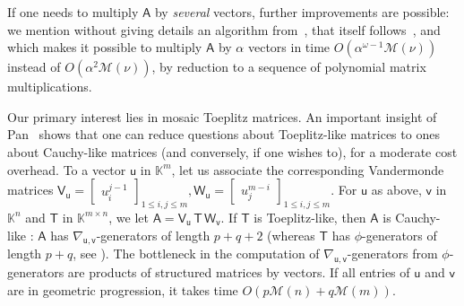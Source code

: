 \documentclass[sigconf]{acmart}
\newcommand{\ve}{\ensuremath{\mathsf{e}}}
\newcommand{\vg}{\ensuremath{\mathsf{g}}}
\newcommand{\vh}{\ensuremath{\mathsf{h}}}
\newcommand{\vu}{\ensuremath{\mathsf{u}}}
\newcommand{\vv}{\ensuremath{\mathsf{v}}}
\newcommand{\mA}{\ensuremath{\mathsf{A}}}
\newcommand{\mG}{\ensuremath{\mathsf{G}}}
\newcommand{\mH}{\ensuremath{\mathsf{H}}}
\newcommand{\mT}{\ensuremath{\mathsf{T}}}
\newcommand{\mV}{\ensuremath{\mathsf{V}}}
\newcommand{\mW}{\ensuremath{\mathsf{W}}}
\newcommand{\K}{\ensuremath{\mathbb{K}}}
\newcommand{\M}{\ensuremath{\mathscr{M}}}
\newcommand{\mx}{\ensuremath{\nu}}
\newcommand{\todo}[1]{(\textbf{todo:} #1)}
\theoremstyle{acmdefinition}
\begin{document}
If one needs to multiply $\mA$ by {\em several} vectors,
further improvements are possible: we mention without giving details
an algorithm from~\cite{BoJeMoSc16}, that itself
follows~\cite{BoJeSc08}, and which makes it possible to multiply $\mA$
by $\alpha$ vectors in time $O(\alpha^{\omega-1} \M(\mx))$ instead of
$O(\alpha^2 \M(\mx))$, by reduction to a sequence of polynomial matrix
multiplications.

{}
Our primary interest lies in mosaic
Toep\-litz matrices. An important insight of Pan~\cite{Pan90} shows
that one can reduce questions about Toeplitz-like matrices to ones
about Cauchy-like matrices (and conversely, if one wishes to), for a
moderate cost overhead. 
%
To a vector $\vu$ in $\K^m$, let us  associate the
corresponding Vandermonde matrices
$
\mV_\vu = \left[\begin{smallmatrix}
u_i^{j-1}
\end{smallmatrix}\right]_{1 \leq i,j \leq m},
\mW_\vu = \left[\begin{smallmatrix}
u_j^{m-i}
\end{smallmatrix}\right]_{1 \leq i,j \leq m}.
$
%
For $\vu$ as above, $\vv$ in $\K^n$ and $\mT$ in $\K^{m\times n}$, we
let $\mA = \mV_\vu\, \mT\, \mW_\vv$. If $\mT$ is Toeplitz-like, then
$\mA$ is Cauchy-like : $\mA$ has $\nabla_{\vu,\vv}$-generators of
length $p+q+2$ (whereas $\mT$ has $\phi$-generators of length $p+q$,
see \cite[Chapter~4.8]{Pan01}). The bottleneck in the computation of
$\nabla_{\vu,\vv}$-generators from $\phi$-generators are products of
structured matrices by vectors.  If all entries of $\vu$ and $\vv$ are
in geometric progression, it takes time $O(p \M(n) + q \M(m))$.


\end{document}
